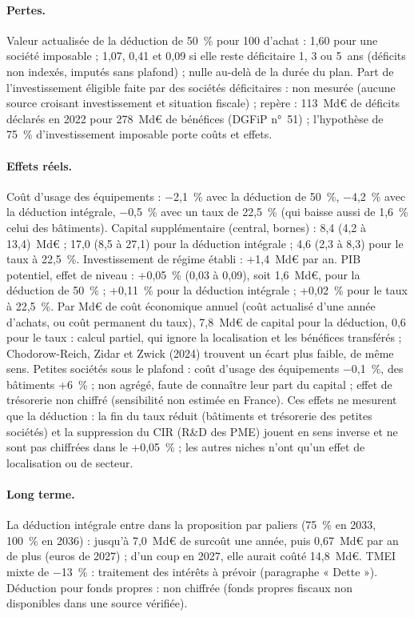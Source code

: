 \paragraph{Pertes.} Valeur actualisée de la déduction de 50~\% pour 100 d'achat : 1,60 pour une société imposable ;
1,07, 0,41 et 0,09 si elle reste déficitaire 1, 3 ou 5~ans (déficits non indexés, imputés sans plafond) ; nulle au-delà
de la durée du plan. Part de l'investissement éligible faite par des sociétés déficitaires : non mesurée (aucune source
croisant investissement et situation fiscale) ; repère : 113~Md€ de déficits déclarés en 2022 pour 278~Md€ de bénéfices
(DGFiP n°~51) ; l'hypothèse de 75~\% d'investissement imposable porte coûts et effets.

\paragraph{Effets réels.} Coût d'usage des équipements : $-$2,1~\% avec la déduction de 50~\%, $-$4,2~\% avec la déduction
intégrale, $-$0,5~\% avec un taux de 22,5~\% (qui baisse aussi de 1,6~\% celui des bâtiments). Capital supplémentaire
(central, bornes) : 8,4 (4,2 à 13,4)~Md€ ; 17,0 (8,5 à 27,1) pour la déduction intégrale ; 4,6 (2,3 à 8,3) pour le taux à
22,5~\%. Investissement de régime établi : +1,4~Md€ par an. PIB potentiel, effet de niveau : +0,05~\% (0,03 à 0,09), soit
1,6~Md€, pour la déduction de 50~\% ; +0,11~\% pour la déduction intégrale ; +0,02~\% pour le taux à 22,5~\%. Par Md€ de coût
économique annuel (coût actualisé d'une année d'achats, ou coût permanent du taux), 7,8~Md€ de capital pour la
déduction, 0,6 pour le taux : calcul partiel, qui ignore la localisation et les bénéfices transférés ; Chodorow-Reich,
Zidar et Zwick (2024) trouvent un écart plus faible, de même sens. Petites sociétés sous le plafond : coût d'usage des
équipements $-$0,1~\%, des bâtiments +6~\% ; non agrégé, faute de connaître leur part du capital ; effet de trésorerie non
chiffré (sensibilité non estimée en France). Ces effets ne mesurent que la déduction : la fin
du taux réduit (bâtiments et trésorerie des petites sociétés) et la suppression du CIR (R\&D des PME) jouent en sens
inverse et ne sont pas chiffrées dans le +0,05~\% ; les autres niches n'ont qu'un effet de localisation ou de secteur.

\paragraph{Long terme.} La déduction intégrale entre dans la proposition par paliers (75~\% en 2033, 100~\% en 2036) :
jusqu'à 7,0~Md€ de surcoût une année, puis 0,67~Md€ par an de plus (euros de 2027) ; d'un coup en 2027, elle aurait coûté
14,8~Md€. TMEI mixte de $-$13~\% : traitement des intérêts à prévoir (paragraphe « Dette »). Déduction pour fonds propres :
non chiffrée (fonds propres fiscaux non disponibles dans une source vérifiée).


